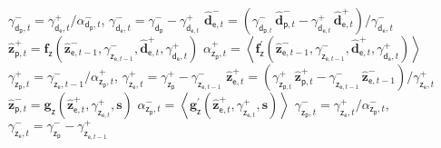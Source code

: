 \begin{algorithm}[h!]
\begin{algorithmic}[1]
\StateBlue $\gamma_{\bm{\mathsf{d}}_{\mathsf{p}}, t}^-=\gamma_{\bm{\mathsf{d}}_{\mathsf{e}},t}^+ / \alpha_{\bm{\mathsf{d}}_\mathsf{p}, t}^-$, \quad$\gamma_{\bm{\mathsf{d}}_{\mathsf{e}},t}^-=\gamma_{\bm{\mathsf{d}}_{\mathsf{p}}}^--\gamma_{\bm{\mathsf{d}}_{\mathsf{e}, t}}^+$
\StateBlue $\mathbf{\widehat{d}}^-_{\mathsf{e}, t}=\left(\gamma_{\bm{\mathsf{d}}_{\mathsf{p},t}}^-\, \widehat{\bm{d}}_{\mathsf{p}, t}^--\gamma_{\bm{\mathsf{d}}_{\mathsf{e}, t}}^+\, \mathbf{\widehat{d}}^+_{\mathsf{e},t}\right) / \gamma_{\bm{\mathsf{d}}_{\mathsf{e}},t}^-$
\Statex{}
\StateBlue $\widehat{\bm{z}}_{\mathsf{p}, t}^+=\bm{f}_{\bm{\mathsf{z}}}\left(\mathbf{\widehat{z}}^-_{\mathsf{e},t-1}, \gamma_{\bm{\mathsf{z}}_{\mathsf{e}, t-1}}^-, \mathbf{\widehat{d}}^+_{\mathsf{e}, t}, \gamma_{\bm{\mathsf{d}}_{\mathsf{e}},t}^+\right)$ \label{algo:denoising-d}
\StateBlue $\alpha_{\bm{\mathsf{z}}_\mathsf{p}, t}^+=\left\langle \bm{f}_{\bm{\mathsf{z}}}^{\prime}\left(\mathbf{\widehat{z}}^-_{\mathsf{e},t-1}, \gamma_{\bm{\mathsf{z}}_{\mathsf{e}, t-1}}^-,\mathbf{\widehat{d}}^+_{\mathsf{e}, t}, \gamma_{\bm{\mathsf{d}}_{\mathsf{e}},t}^+\right)\right\rangle$
\StateBlue $\gamma_{\bm{\mathsf{z}}_{\mathsf{p}}, t}^+=\gamma_{\bm{\mathsf{z}}_{\mathsf{e}},t-1}^- / \alpha_{\bm{\mathsf{z}}_\mathsf{p}, t}^+$, \quad$\gamma_{\bm{\mathsf{z}}_{\mathsf{e}},t}^+=\gamma_{\bm{\mathsf{z}}_{\mathsf{p}}}^+-\gamma_{\bm{\mathsf{z}}_{\mathsf{e}, t-1}}^-$
\StateBlue $\mathbf{\widehat{z}}^+_{\mathsf{e}, t}=\left(\gamma_{\bm{\mathsf{z}}_{\mathsf{p},t}}^+\, \widehat{\bm{z}}_{\mathsf{p}, t}^+-\gamma_{\bm{\mathsf{z}}_{\mathsf{e}, t-1}}^-\, \mathbf{\widehat{z}}^-_{\mathsf{e},t-1}\right) / \gamma_{\bm{\mathsf{z}}_{\mathsf{e}},t}^+$\vspace{0.1cm}
\Statex{}\vspace{0.1cm}
\StateGreen $\widehat{\bm{z}}_{\mathsf{p}, t}^-=\bm{g}_{\bm{\mathsf{z}}}\left(\mathbf{\widehat{z}}^+_{\mathsf{e},t}, \gamma_{\bm{\mathsf{z}}_{\mathsf{e},t}}^+,\mathbf{s}\right)$
\StateGreen $\alpha_{\bm{\mathsf{z}}_\mathsf{p}, t}^-=\left\langle \bm{g}_{\bm{\mathsf{z}}}^{\prime}\left(\mathbf{\widehat{z}}^+_{\mathsf{e},t}, \gamma_{\bm{\mathsf{z}}_{\mathsf{e}, t}}^+,\mathbf{s}\right)\right\rangle$
\StateGreen $\gamma_{\bm{\mathsf{z}}_{\mathsf{p}}, t}^-=\gamma_{\bm{\mathsf{z}}_{\mathsf{e}},t}^+ / \alpha_{\bm{\mathsf{z}}_\mathsf{p}, t}^-$, \quad$\gamma_{\bm{\mathsf{z}}_{\mathsf{e}},t}^-=\gamma_{\bm{\mathsf{z}}_{\mathsf{p}}}^--\gamma_{\bm{\mathsf{z}}_{\mathsf{e}, t-1}}^+$

\end{algorithmic}
\end{algorithm}
